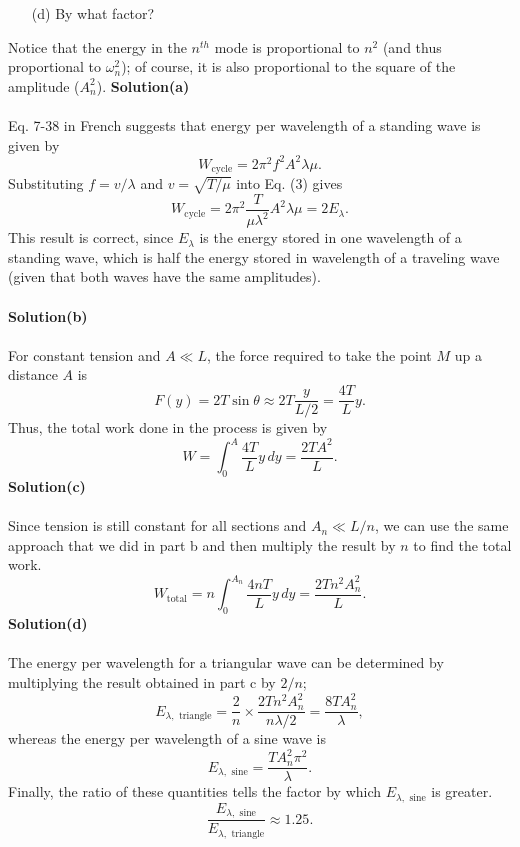 \documentclass[12pt,a4paper]{article}
\begin{document}
\begin{enumerate}
    \item[(d)]By what factor? 
\end{enumerate}
Notice that the energy in the $n^{th}$ mode is proportional to $n^2$ (and thus proportional to $\omega_n^2$); of course, it is also proportional to the square of the amplitude ($A_n^2$).
\newpage
\textbf{Solution(a)}
\\
\\Eq. 7-38 in French suggests that energy per wavelength of a standing wave is given by
\begin{equation}
    W_{\text{cycle}}=2\pi^2f^2A^2\lambda\mu.
\end{equation}
Substituting $f=v/\lambda$ and $v=\sqrt{T/\mu}$ into Eq. (3) gives
\[W_{\text{cycle}}=2\pi^2\frac{T}{\mu\lambda^2}A^2\lambda\mu=2E_\lambda.\]
This result is correct, since $E_\lambda$ is the energy stored in one wavelength of a standing wave, which is half the energy stored in wavelength of a traveling wave (given that both waves have the same amplitudes). 
\\
\\\textbf{Solution(b)}
\\
\\For constant tension and $A\ll L$, the force required to take the point $M$ up a distance $A$ is
\[F(y)=2T\sin\theta\approx2T\frac{y}{L/2}=\frac{4T}{L}y.\]
Thus, the total work done in the process is given by 
\[W=\int_{0}^{A}\frac{4T}{L}y\,dy=\frac{2TA^2}{L}.\]
\textbf{Solution(c)}
\\
\\Since tension is still constant for all sections and $A_n\ll L/n$, we can use the same approach that we did in part b and then multiply the result by $n$ to find the total work.
\[W_{\text{total}}=n\int_{0}^{A_n}\frac{4nT}{L}y\,dy=\frac{2Tn^2A_n^2}{L}.\]
\textbf{Solution(d)}
\\
\\The energy per wavelength for a triangular wave can be determined by multiplying the result obtained in part c by $2/n$;
\[E_{\lambda,\text{ triangle}}=\frac{2}{n}\times\frac{2Tn^2A_n^2}{n\lambda/2}=\frac{8TA_n^2}{\lambda},\]
whereas the energy per wavelength of a sine wave is
\[E_{\lambda,\text{ sine}}=\frac{TA_n^2\pi^2}{\lambda}.\]
Finally, the ratio of these quantities tells the factor by which $E_{\lambda,\text{ sine}}$ is greater. 
\[\frac{E_{\lambda,\text{ sine}}}{E_{\lambda,\text{ triangle}}}\approx1.25.\]
\end{document}
